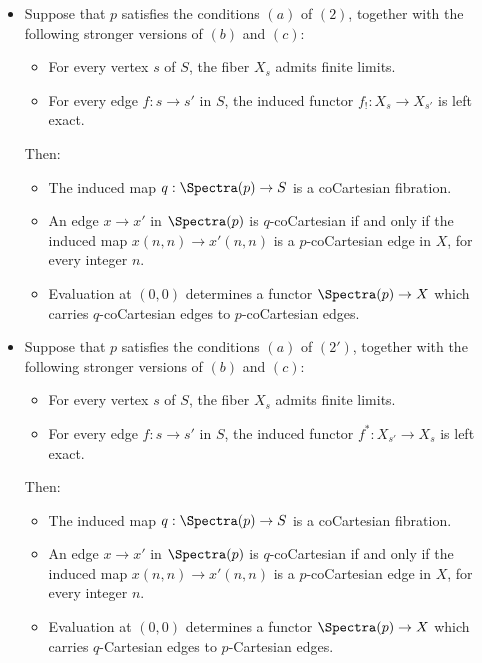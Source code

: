 \begin{proposition}
\begin{itemize}
\item[$(3)$] Suppose that $p$ satisfies the conditions $(a)$ of $(2)$, together
with the following stronger versions of $(b)$ and $(c)$:
\begin{itemize}
\item[$(b')$] For every vertex $s$ of $S$, the fiber $X_{s}$ admits finite limits.
\item[$(c')$] For every edge $f: s \rightarrow s'$ in $S$, the induced functor
$f_{!}: X_{s} \rightarrow X_{s'}$ is left exact.
\end{itemize}
Then:
\begin{itemize}
\item[$(i)$] The induced map $q: \Spectra(p) \rightarrow S$ is a coCartesian fibration.
\item[$(ii)$] An edge $x \rightarrow x'$ in $\Spectra(p)$ is $q$-coCartesian if and only
if the induced map $x(n,n) \rightarrow x'(n,n)$ is a $p$-coCartesian edge in $X$, for every
integer $n$.
\item[$(iii)$] Evaluation at $(0,0)$ determines a functor $\Spectra(p) \rightarrow X$
which carries $q$-coCartesian edges to $p$-coCartesian edges.
\end{itemize}

\item[$(3')$] Suppose that $p$ satisfies the conditions $(a)$ of $(2')$, together
with the following stronger versions of $(b)$ and $(c)$:
\begin{itemize}
\item[$(b')$] For every vertex $s$ of $S$, the fiber $X_{s}$ admits finite limits.
\item[$(c')$] For every edge $f: s \rightarrow s'$ in $S$, the induced functor
$f^{\ast}: X_{s'} \rightarrow X_{s}$ is left exact.
\end{itemize}
Then:
\begin{itemize}
\item[$(i)$] The induced map $q: \Spectra(p) \rightarrow S$ is a coCartesian fibration.
\item[$(ii)$] An edge $x \rightarrow x'$ in $\Spectra(p)$ is $q$-coCartesian if and only
if the induced map $x(n,n) \rightarrow x'(n,n)$ is a $p$-coCartesian edge in $X$, for every
integer $n$.
\item[$(iii)$] Evaluation at $(0,0)$ determines a functor $\Spectra(p) \rightarrow X$
which carries $q$-Cartesian edges to $p$-Cartesian edges.
\end{itemize}


\end{itemize}
\end{proposition}
